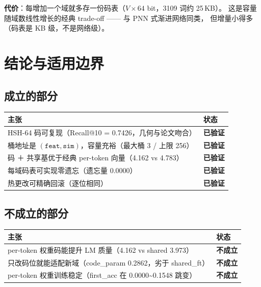 \documentclass[11pt,a4paper]{ctexart}
\newcommand{\warn}[1]{\textcolor{warnred}{\textbf{#1}}}
\newcommand{\ok}[1]{\textcolor{okgreen}{\textbf{#1}}}
\begin{document}
\textbf{代价}：每增加一个域就多存一份码表（$V\times64$ bit，3109 词约 25\,KB）。
这是容量随域数线性增长的经典 trade-off —— 与 PNN 式渐进网络同类，
但增量小得多（码表是 KB 级，不是网络级）。

\section{结论与适用边界}

\subsection{成立的部分}

\begin{center}
\begin{tabularx}{\textwidth}{@{}Xl@{}}
\toprule
\textbf{主张} & \textbf{状态} \\
\midrule
HSH-64 码可复现（Recall@10 = 0.7426，几何与论文吻合） & \ok{已验证} \\
桶地址是 $(\texttt{feat},\texttt{sim})$，容量充裕（最大桶 3 / 上限 256） & \ok{已验证} \\
码 ＋ 共享基优于经典 per-token 向量（4.162 vs 4.783） & \ok{已验证} \\
每域码表可实现零遗忘（遗忘量 0.0000） & \ok{已验证} \\
热更改可精确回滚（逐位相同） & \ok{已验证} \\
\bottomrule
\end{tabularx}
\end{center}

\subsection{不成立的部分}

\begin{center}
\begin{tabularx}{\textwidth}{@{}Xl@{}}
\toprule
\textbf{主张} & \textbf{状态} \\
\midrule
per-token 权重码能提升 LM 质量（4.162 vs shared 3.973） & \warn{不成立} \\
只改码位就能适配新域（code\_param 0.2862，劣于 shared\_ft） & \warn{不成立} \\
per-token 权重训练稳定（first\_acc 在 0.0000\textasciitilde0.1548 跳变） & \warn{不成立} \\
\bottomrule
\end{tabularx}
\end{center}
\end{document}
